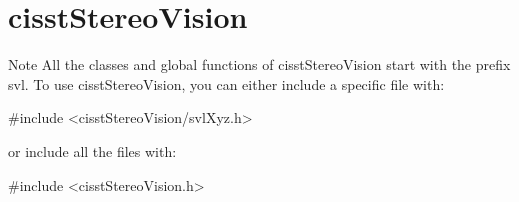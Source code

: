 \hypertarget{group__cisst_stereo_vision}{}\section{cisst\+Stereo\+Vision}
\label{group__cisst_stereo_vision}
\begin{DoxyNote}{Note}
All the classes and global functions of cisst\+Stereo\+Vision start with the prefix svl. To use cisst\+Stereo\+Vision, you can either include a specific file with\+: 
\begin{DoxyCode}
\textcolor{preprocessor}{#include <cisstStereoVision/svlXyz.h>}
\end{DoxyCode}
 or include all the files with\+: 
\begin{DoxyCode}
\textcolor{preprocessor}{#include <cisstStereoVision.h>}
\end{DoxyCode}
 
\end{DoxyNote}
